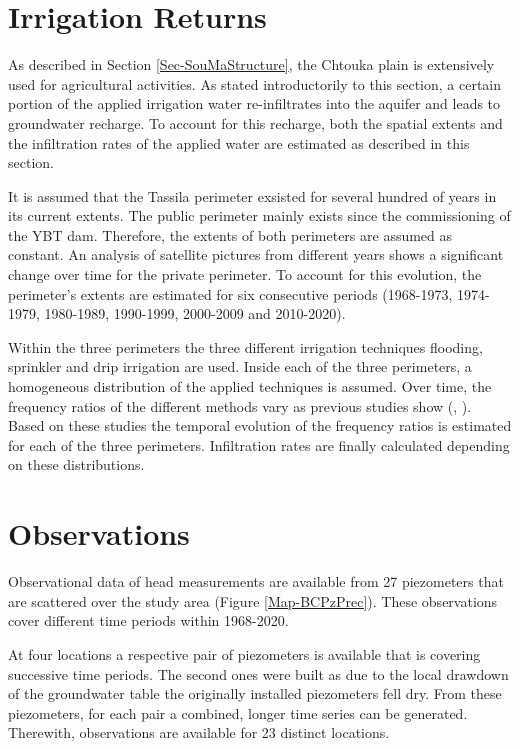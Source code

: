 
\section{Irrigation Returns}
\label{Sec-IrrRech}

As described in Section \ref{Sec-SouMaStructure}, the Chtouka plain is extensively used for agricultural activities. As stated introductorily to this section, a certain portion of the applied irrigation water re-infiltrates into the aquifer and leads to groundwater recharge. To account for this recharge, both the spatial extents and the infiltration rates of the applied water are estimated as described in this section.

It is assumed that the Tassila perimeter exsisted for several hundred of years in its current extents. The public perimeter mainly exists since the commissioning of the YBT dam. Therefore, the extents of both perimeters are assumed as constant. An analysis of satellite pictures from different years shows a significant change over time for the private perimeter. To account for this evolution, the perimeter's extents are estimated for six consecutive periods (1968-1973, 1974-1979, 1980-1989, 1990-1999, 2000-2009 and 2010-2020). 

Within the three perimeters the three different irrigation techniques flooding, sprinkler and drip irrigation are used. Inside each of the three perimeters, a homogeneous distribution of the applied techniques is assumed. Over time, the frequency ratios of the different methods vary as previous studies show (\cite{Resing.2003}, \cite{Anzar.2016}). Based on these studies the temporal evolution of the frequency ratios is estimated for each of the three perimeters. Infiltration rates are finally calculated depending on these distributions.


\section{Observations}
\label{Sec-Piezometers}

Observational data of head measurements are available from 27 piezometers that are scattered over the study area (Figure \ref{Map-BCPzPrec}). These observations cover different time periods within 1968-2020.

At four locations a respective pair of piezometers is available that is covering successive time periods. The second ones were built as due to the local drawdown of the groundwater table the originally installed piezometers fell dry. From these piezometers, for each pair a combined, longer time series can be generated. Therewith, observations are available for 23 distinct locations.

